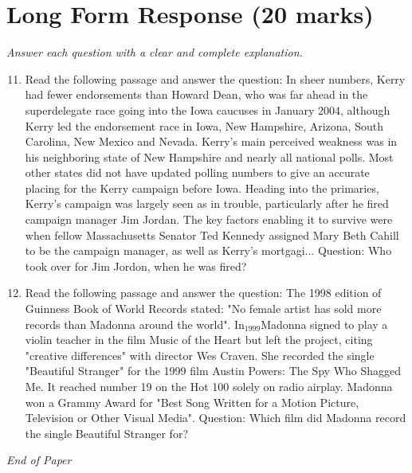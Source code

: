 \documentclass[12pt]{article}
\begin{document}
\section*{Long Form Response (20 marks)}
\textit{Answer each question with a clear and complete explanation.}
\begin{enumerate}[label=\arabic*.]
\setcounter{enumi}{10}
\item Read the following passage and answer the question: In sheer numbers, Kerry had fewer endorsements than Howard Dean, who was far ahead in the superdelegate race going into the Iowa caucuses in January 2004, although Kerry led the endorsement race in Iowa, New Hampshire, Arizona, South Carolina, New Mexico and Nevada. Kerry's main perceived weakness was in his neighboring state of New Hampshire and nearly all national polls. Most other states did not have updated polling numbers to give an accurate placing for the Kerry campaign before Iowa. Heading into the primaries, Kerry's campaign was largely seen as in trouble, particularly after he fired campaign manager Jim Jordan. The key factors enabling it to survive were when fellow Massachusetts Senator Ted Kennedy assigned Mary Beth Cahill to be the campaign manager, as well as Kerry's mortgagi... Question: Who took over for Jim Jordon, when he was fired?
\item Read the following passage and answer the question: The 1998 edition of Guinness Book of World Records stated: "No female artist has sold more records than Madonna around the world". In$_{1999}$Madonna signed to play a violin teacher in the film Music of the Heart but left the project, citing "creative differences" with director Wes Craven. She recorded the single "Beautiful Stranger" for the 1999 film Austin Powers: The Spy Who Shagged Me. It reached number 19 on the Hot 100 solely on radio airplay. Madonna won a Grammy Award for "Best Song Written for a Motion Picture, Television or Other Visual Media". Question: Which film did Madonna record the single Beautiful Stranger for?
\end{enumerate}

\vfill
\noindent\textit{End of Paper}
\end{document}
